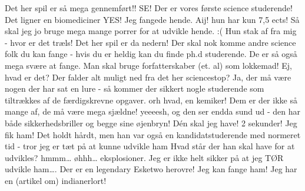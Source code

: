 \documentclass[a4paper,11pt]{article}
\begin{document}
\begin{sketch}
 Det her spil er så mega gennemført!!
 SE! Der er vores første science studerende! Det ligner en biomediciner
 YES! Jeg fangede hende. Aij! hun har kun 7,5 ects! Så skal jeg jo bruge mega mange porrer for at udvikle hende. :(
 Hun stak af fra mig - hvor er det træls! Det her spil er da nedern! 
 Der skal nok komme andre science folk du kan fange - hvis du er heldig kan du finde ph.d studerende. De er så også mega svære at fange. Man skal bruge forfatterskaber (et. al) som lokkemad!
 Ej, hvad er det? Der falder alt muligt ned fra det her sciencestop?
 Ja, der må være nogen der har sat en lure - så kommer der sikkert nogle studerende som tiltrækkes af de færdigskrevne opgaver. 
 orh hvad, en kemiker! Dem er der ikke så mange af, de må være mega sjældne! 
 yeeeesh, og den ser endda sund ud - den har både sikkerhedsbriller og begge sine øjenbryn! 
 Dén skal jeg have! 2 sekunder! 
 Jeg fik ham! Det holdt hårdt, men han var også en kandidatstuderende med normeret tid - tror jeg er tæt på at kunne udvikle ham
 Hvad står der han skal have for at udvikles?
 hmmm… øhhh… eksplosioner. Jeg er ikke helt sikker på at jeg TØR udvikle ham…. 
 Der er en legendary Esketwo herovre! 
 Jeg kan fange ham! Jeg har en (artikel om) indianerlort! 


\end{sketch}
\end{document}
